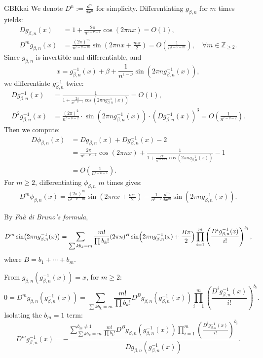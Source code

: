\documentclass{amsart}
\theoremstyle{definition}
\begin{document}
\begin{CJK*}{GBK}{kai}
We denote $D^n:=\frac{d^n}{dx^n}$ for simplicity.  Differentiating $g_{\beta,n}$ for  $m$ times yields:
\begin{align*}
Dg_{\beta,n}(x) &= 1 + \frac{2\pi}{n^{\iota-\nu-1}}\cos(2\pi n x) = O(1), \\
D^{m}g_{\beta,n}(x) &= \frac{(2\pi)^m}{n^{\iota-\nu-m }}\sin\left(2\pi n x + \frac{m\pi}{2}\right) = O\left(\frac{1}{n^{\iota-\nu-m}}\right), \quad \forall m \in \mathbb{Z}_{\geq 2}.
\end{align*}
Since $g_{\beta,n}$ is invertible and differentiable, and
\[
x = g_{\beta,n}^{-1}(x) + \beta + \frac{1}{n^{\iota-\nu}}\sin\left(2\pi n g_{\beta,n}^{-1}(x)\right),
\]
we differentiate $g_{\beta,n}^{-1}$ twice:
\begin{align*}
Dg_{\beta,n}^{-1}(x) &= \frac{1}{1 + \frac{2\pi}{n^{\iota-\nu-1}}\cos\left(2\pi n g_{\beta,n}^{-1}(x)\right)} = O(1), \\
D^{2}g_{\beta,n}^{-1}(x) &= \frac{(2\pi)^{2}}{n^{\iota-\nu-2}} \cdot \sin\left(2\pi n g_{\beta,n}^{-1}(x)\right) \cdot \left(Dg_{\beta,n}^{-1}(x)\right)^{3} = O\left(\frac{1}{n^{\iota-\nu-2}}\right).
\end{align*}
Then we compute:
\begin{align*}
D\phi_{\beta,n}(x) &= Dg_{\beta,n}(x) + Dg_{\beta,n}^{-1}(x) - 2 \\
&= \frac{2\pi}{n^{\iota-\nu-1}}\cos(2\pi n x) + \frac{1}{1 + \frac{2\pi}{n^{\iota-\nu-1}}\cos\left(2\pi n g_{\beta,n}^{-1}(x)\right)} - 1 \\
&= O\left(\frac{1}{n^{\iota-\nu-1}}\right).
\end{align*}
For \( m \geq 2 \), differentiating \( \phi_{\beta,n} \) $m$ times gives:
\begin{align*}
D^{m}\phi_{\beta,n}(x) = \frac{(2\pi)^m}{n^{\iota-\nu-m }}\sin\left(2\pi n x + \frac{m\pi}{2}\right) - \frac{1}{n^{\iota-\nu }}\frac{d^m}{dx^m}\sin\left(2\pi n g_{\beta,n}^{-1}(x)\right).
\end{align*}

By \emph{Fa\`{a} di Bruno's formula},
\[
D^m\sin\bigl(2\pi n g_{\beta,n}^{-1}(x)\bigr)
= \sum_{\sum k b_k = m} \frac{m!}{\prod b_k!}
(2\pi n)^{B} \sin\Bigl(2\pi n g_{\beta,n}^{-1}(x) + \frac{B\pi}{2}\Bigr)
\prod_{i=1}^m \left(\frac{D^{i}g_{\beta,n}^{-1}(x)}{i!}\right)^{b_i},
\]
where $B = b_1 + \cdots + b_m$.

From $g_{\beta,n}(g_{\beta,n}^{-1}(x)) = x$, for $m \geq 2$:
\[
0 = D^mg_{\beta,n}(g_{\beta,n}^{-1}(x))
= \sum_{\sum k b_k = m} \frac{m!}{\prod b_k!}
D^{B}g_{\beta,n}(g_{\beta,n}^{-1}(x))
\prod_{i=1}^m \left(\frac{D^{i}g_{\beta,n}^{-1}(x)}{i!}\right)^{b_i}.
\]
Isolating the $b_m = 1$ term:
\[
D^{m}g_{\beta,n}^{-1}(x) = -\frac{\sum_{\sum k b_k = m}^{b_m \neq 1} \frac{m!}{\prod b_k!}
D^{B}g_{\beta,n}(g_{\beta,n}^{-1}(x))
\prod_{i=1}^m \left(\frac{D^{i}g_{\beta,n}^{-1}(x)}{i!}\right)^{b_i}}{Dg_{\beta,n}(g_{\beta,n}^{-1}(x))}.
\]


\end{CJK*}
\end{document}
